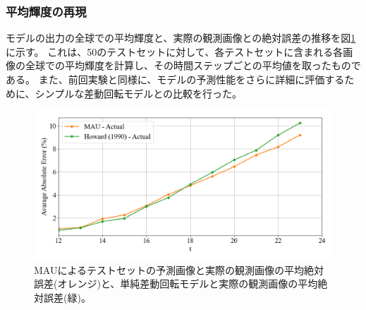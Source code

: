       \subsubsection{平均輝度の再現}
        モデルの出力の全球での平均輝度と、実際の観測画像との絶対誤差の推移を図\ref{fig:exp2_error}に示す。
        これは、50のテストセットに対して、各テストセットに含まれる各画像の全球での平均輝度を計算し、その時間ステップごとの平均値を取ったものである。
        また、前回実験と同様に、モデルの予測性能をさらに詳細に評価するために、シンプルな差動回転モデルとの比較を行った。
        \begin{figure}[htbp]
          \centering
          \includegraphics[width=\textwidth]{figures/exp2/error_dr.png}
          \caption{MAUによるテストセットの予測画像と実際の観測画像の平均絶対誤差(オレンジ)と、単純差動回転モデルと実際の観測画像の平均絶対誤差(緑)。}
          \label{fig:exp2_error}
        \end{figure}
        
